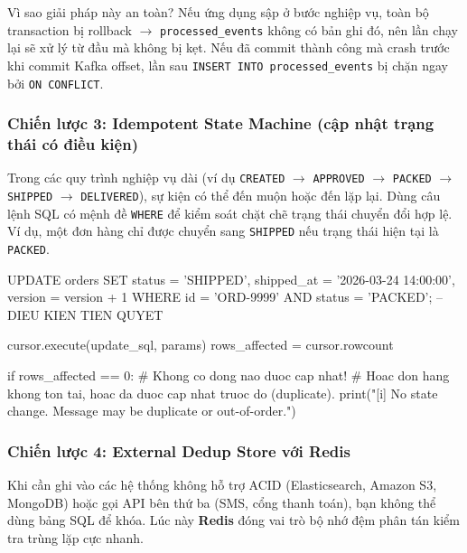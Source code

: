 \documentclass[12pt]{article}
\begin{document}
\begin{guidelinebox}{Vì sao giải pháp này an toàn?}
Nếu ứng dụng sập ở bước nghiệp vụ, toàn bộ transaction bị rollback $\rightarrow$ \texttt{processed\_events} không có bản ghi đó, nên lần chạy lại sẽ xử lý từ đầu mà không bị kẹt. Nếu đã commit thành công mà crash trước khi commit Kafka offset, lần sau \texttt{INSERT INTO processed\_events} bị chặn ngay bởi \texttt{ON CONFLICT}.
\end{guidelinebox}

\subsubsection{Chiến lược 3: Idempotent State Machine (cập nhật trạng thái có điều kiện)}

Trong các quy trình nghiệp vụ dài (ví dụ \texttt{CREATED} $\rightarrow$ \texttt{APPROVED} $\rightarrow$ \texttt{PACKED} $\rightarrow$ \texttt{SHIPPED} $\rightarrow$ \texttt{DELIVERED}), sự kiện có thể đến muộn hoặc đến lặp lại. Dùng câu lệnh SQL có mệnh đề \texttt{WHERE} để kiểm soát chặt chẽ trạng thái chuyển đổi hợp lệ. Ví dụ, một đơn hàng chỉ được chuyển sang \texttt{SHIPPED} nếu trạng thái hiện tại là \texttt{PACKED}.

\begin{aivnsqlbox}
UPDATE orders
SET status = 'SHIPPED',
    shipped_at = '2026-03-24 14:00:00',
    version = version + 1
WHERE id = 'ORD-9999'
  AND status = 'PACKED';   -- DIEU KIEN TIEN QUYET
\end{aivnsqlbox}

\begin{aivnpybox}
cursor.execute(update_sql, params)
rows_affected = cursor.rowcount

if rows_affected == 0:
    # Khong co dong nao duoc cap nhat!
    # Hoac don hang khong ton tai, hoac da duoc cap nhat truoc do (duplicate).
    print("[i] No state change. Message may be duplicate or out-of-order.")
\end{aivnpybox}

\subsubsection{Chiến lược 4: External Dedup Store với Redis}

Khi cần ghi vào các hệ thống không hỗ trợ ACID (Elasticsearch, Amazon S3, MongoDB) hoặc gọi API bên thứ ba (SMS, cổng thanh toán), bạn không thể dùng bảng SQL để khóa. Lúc này \textbf{Redis} đóng vai trò bộ nhớ đệm phân tán kiểm tra trùng lặp cực nhanh.
\end{document}
